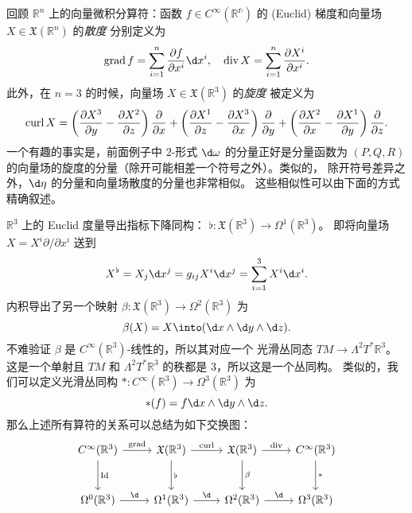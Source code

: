 回顾 $\mathbb{R}^n$ 上的向量微积分算符：函数 $f\in C^\infty(\mathbb{R^n})$
的 (Euclid) 梯度和向量场 $X\in \mathfrak{X}(\mathbb{R}^n)$ 的\emph{散度}
分别定义为
\begin{equation}
  \grad f=\sum_{i=1}^n\frac{\partial f}{\partial x^i}\d x^i,\quad 
  \dive X=\sum_{i=1}^n\frac{\partial X^i}{\partial x^i}.
\end{equation}
此外，在 $n=3$ 的时候，向量场 $X\in \mathfrak{X}(\mathbb{R}^3)$ 的\emph{旋度}
被定义为
\[
  \operatorname{curl} X=\left(\frac{\partial X^3}{\partial y}-\frac{\partial X^2}{\partial z}\right)
  \frac{\partial}{\partial x}+  \left(\frac{\partial X^1}{\partial z}-\frac{\partial X^3}{\partial x}\right)
  \frac{\partial}{\partial y}+
  \left(\frac{\partial X^2}{\partial x}-\frac{\partial X^1}{\partial y}\right)
  \frac{\partial}{\partial z}.
\]
一个有趣的事实是，前面例子中 $2$-形式 $\d\omega$ 的分量正好是分量函数为
$(P,Q,R)$ 的向量场的旋度的分量（除开可能相差一个符号之外）。类似的，
除开符号差异之外，$\d\eta$ 的分量和向量场散度的分量也非常相似。
这些相似性可以由下面的方式精确叙述。

$\mathbb{R}^3$ 上的 Euclid 度量导出指标下降同构：
$\flat:\mathfrak{X}(\mathbb{R}^3)\to \Omega^1(\mathbb{R}^3)$。
即将向量场 $X=X^i\partial/\partial x^i$ 送到
\[
  X^\flat=X_j\d x^j=g_{ij}X^i\d x^j=\sum_{i=1}^3 X^i\d x^i.
\]
内积导出了另一个映射 $\beta:\mathfrak{X}(\mathbb{R}^3)\to \Omega^2(\mathbb{R}^3)$
为
\begin{equation}
  \beta(X)=X\into (\d x\wedge\d y\wedge \d z).
\end{equation}
不难验证 $\beta$ 是 $C^\infty(\mathbb{R}^3)$-线性的，所以其对应一个
光滑丛同态 $TM\to \Lambda^2T^*\mathbb{R}^3$。这是一个单射且
$TM$ 和 $\Lambda^2T^*\mathbb{R}^3$ 的秩都是 $3$，所以这是一个丛同构。
类似的，我们可以定义光滑丛同构 $*:C^\infty(\mathbb{R}^3)\to \Omega^3(\mathbb{R}^3)$
为
\begin{equation}
  *(f)=f\d x\wedge\d y\wedge\d z.
\end{equation}
那么上述所有算符的关系可以总结为如下交换图：
\begin{equation}
  \begin{tikzcd}[row sep=large]
    C^\infty(\mathbb{R}^3)\arrow[r,"\grad"]\arrow[d,"\Id"]
    & \mathfrak{X}(\mathbb{R}^3)\arrow[r,"\curl"]\arrow[d,"\flat"]
    & \mathfrak{X}(\mathbb{R}^3)\arrow[r,"\dive"]\arrow[d,"\beta"]
    & C^\infty(\mathbb{R}^3)\arrow[d,"*"]
    \\
    \Omega^0(\mathbb{R}^3)\arrow[r,"\d"] & 
    \Omega^1(\mathbb{R}^3)\arrow[r,"\d"] & 
    \Omega^2(\mathbb{R}^3)\arrow[r,"\d"] & 
    \Omega^3(\mathbb{R}^3)
  \end{tikzcd}
\end{equation}



